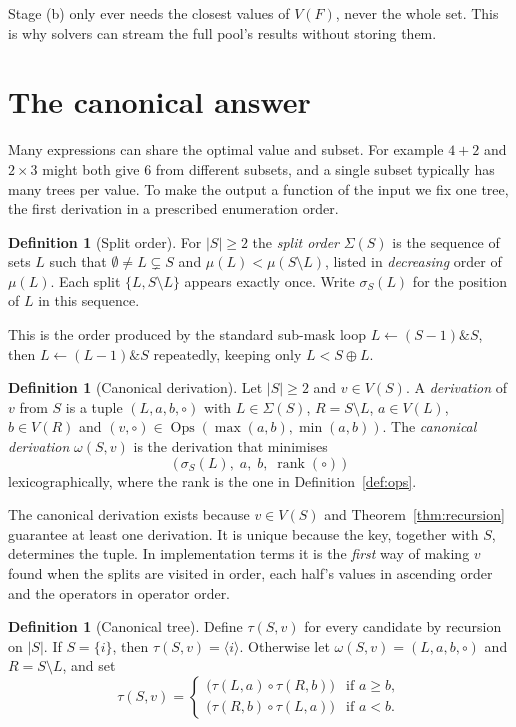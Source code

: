 \documentclass[11pt,a4paper]{article}
\theoremstyle{definition}
\newtheorem{definition}[theorem]{Definition}
\theoremstyle{remark}
\newcommand{\Ops}{\operatorname{Ops}}
\newcommand{\mask}{\mu}
\begin{document}
Stage (b) only ever needs the closest values of $V(F)$, never the whole set. This is why solvers can stream
the full pool's results without storing them.

\section{The canonical answer}\label{sec:canonical}

Many expressions can share the optimal value and subset. For example $4 + 2$ and $2 \times 3$ might both
give $6$ from different subsets, and a single subset typically has many trees per value. To make the output
a function of the input we fix one tree, the first derivation in a prescribed enumeration order.

\begin{definition}[Split order]
For $|S| \ge 2$ the \emph{split order} $\Sigma(S)$ is the sequence of sets $L$ such that
$\emptyset \ne L \subsetneq S$ and $\mask(L) < \mask(S \setminus L)$, listed in \emph{decreasing} order of
$\mask(L)$. Each split $\{L, S \setminus L\}$ appears exactly once. Write $\sigma_S(L)$ for the position of $L$
in this sequence.
\end{definition}

This is the order produced by the standard sub-mask loop
$L \leftarrow (S - 1) \mathbin{\&} S$, then $L \leftarrow (L - 1) \mathbin{\&} S$ repeatedly, keeping only
$L < S \oplus L$.

\begin{definition}[Canonical derivation]\label{def:derivation}
Let $|S| \ge 2$ and $v \in V(S)$. A \emph{derivation} of $v$ from $S$ is a tuple $(L, a, b, \circ)$ with
$L \in \Sigma(S)$, $R = S \setminus L$, $a \in V(L)$, $b \in V(R)$ and $(v, \circ) \in \Ops(\max(a, b), \min(a, b))$.
The \emph{canonical derivation} $\omega(S, v)$ is the derivation that minimises
\[
\bigl(\, \sigma_S(L),\; a,\; b,\; \operatorname{rank}(\circ) \,\bigr)
\]
lexicographically, where the rank is the one in Definition~\ref{def:ops}.
\end{definition}

The canonical derivation exists because $v \in V(S)$ and Theorem~\ref{thm:recursion} guarantee at least one
derivation. It is unique because the key, together with $S$, determines the tuple. In implementation terms
it is the \emph{first} way of making $v$ found when the splits are visited in order, each half's values in
ascending order and the operators in operator order.

\begin{definition}[Canonical tree]
Define $\tau(S, v)$ for every candidate by recursion on $|S|$. If $S = \{i\}$, then $\tau(S, v) = \langle i \rangle$.
Otherwise let $\omega(S, v) = (L, a, b, \circ)$ and $R = S \setminus L$, and set
\[
\tau(S, v) =
\begin{cases}
\bigl(\tau(L, a) \circ \tau(R, b)\bigr) & \text{if } a \ge b,\\[2pt]
\bigl(\tau(R, b) \circ \tau(L, a)\bigr) & \text{if } a < b.
\end{cases}
\]
\end{definition}
\end{document}
